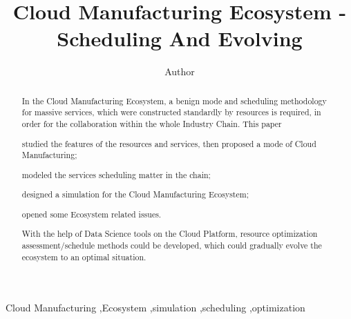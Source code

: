 
\title{Cloud Manufacturing Ecosystem - Scheduling And Evolving}

\author[label1]{Author}
\address[label1]{ZJU}
\begin{abstract}
In the Cloud Manufacturing Ecosystem, a benign mode and scheduling methodology for massive services, which were constructed standardly by resources is required, in order for the collaboration within the whole Industry Chain.
This paper 
\begin{inparaenum}[1)]
\item studied the features of the resources and services, then proposed a mode of Cloud Manufacturing;
\item modeled the services scheduling matter in the chain;
\item designed a simulation for the Cloud Manufacturing Ecosystem;
\item opened some Ecosystem related issues. 
\end{inparaenum}
With the help of Data Science tools on the Cloud Platform, resource optimization assessment/schedule methods could be developed, which could
gradually evolve the ecosystem to an optimal situation.

\end{abstract}

\begin{keyword}
Cloud Manufacturing \sep Ecosystem \sep simulation \sep scheduling \sep optimization
\end{keyword}